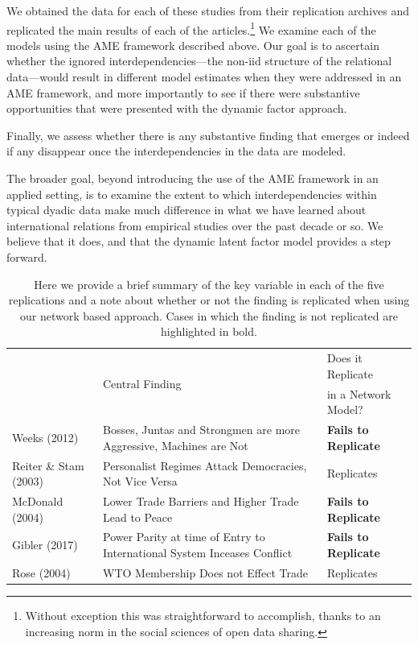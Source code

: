 \documentclass[12pt]{amsart}
\begin{document}
We obtained the data for each of these studies from their replication archives and replicated the main results of each of the articles.\footnote{Without exception this was straightforward to accomplish, thanks to an increasing norm in the social sciences of open data sharing.} We examine each of the models using the AME framework described above.  Our goal is to ascertain whether the ignored interdependencies---the non-iid structure of the relational data---would result in different model estimates when they were addressed in an AME framework, and more importantly to see if there were substantive opportunities that were presented with the dynamic factor approach.  

Finally, we assess whether there is any substantive finding that emerges or indeed if any disappear once the interdependencies in the data are modeled.

The broader goal, beyond introducing the use of the AME framework in an applied setting, is to examine the extent to which interdependencies within typical dyadic data make much difference in what we have learned about international relations from empirical studies over the past decade or so.  We believe that it does, and that the dynamic latent factor model provides a step forward.

\begin{table}[ht]
\centering
	\begin{tabular}{l| p{7cm} l}
	& \multirow{2}{*}{Central Finding} & Does it Replicate \\ 
	& &  in a Network Model? \\
	\hline\hline
		Weeks (2012) & Bosses, Juntas and Strongmen are more Aggressive, Machines are Not & \textbf{Fails to Replicate} \\
		\hline
		Reiter \& Stam (2003) & Personalist Regimes Attack Democracies, Not Vice Versa & Replicates \\ 
		\hline
		McDonald (2004) & Lower Trade Barriers and Higher Trade Lead to Peace & \textbf{Fails to Replicate} \\ 
		\hline
		Gibler (2017) & Power Parity at time of Entry to International System Inceases Conflict & \textbf{Fails to Replicate} \\ 		
		\hline
		Rose (2004) & WTO Membership Does not Effect Trade & Replicates \\ 
	\hline\hline
	\end{tabular}
	\caption{Here we provide a brief summary of the key variable in each of the five replications and a note about whether or not the finding is replicated when using our network based approach. Cases in which the finding is not replicated are highlighted in bold.}
	\label{tab:modelFindingSumm}
\end{table}
\end{document}
